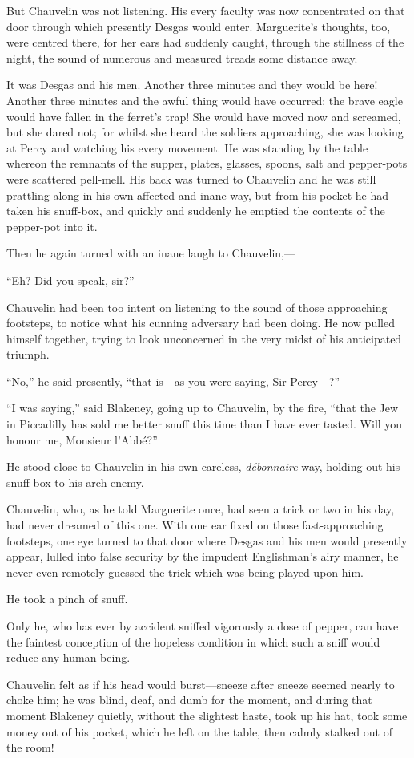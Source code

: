 But Chauvelin was not listening. His every faculty was now concentrated on that door through which presently Desgas would enter. Marguerite's thoughts, too, were centred there, for her ears had suddenly caught, through the stillness of the night, the sound of numerous and measured treads some distance away.

It was Desgas and his men. Another three minutes and they would be here! Another three minutes and the awful thing would have occurred: the brave eagle would have fallen in the ferret's trap! She would have moved now and screamed, but she dared not; for whilst she heard the soldiers approaching, she was looking at Percy and watching his every movement. He was standing by the table whereon the remnants of the supper, plates, glasses, spoons, salt and pepper-pots were scattered pell-mell. His back was turned to Chauvelin and he was still prattling along in his own affected and inane way, but from his pocket he had taken his snuff-box, and quickly and suddenly he emptied the contents of the pepper-pot into it.

Then he again turned with an inane laugh to Chauvelin,---

\enquote{Eh? Did you speak, sir?}

Chauvelin had been too intent on listening to the sound of those approaching footsteps, to notice what his cunning adversary had been doing. He now pulled himself together, trying to look unconcerned in the very midst of his anticipated triumph.

\enquote{No,} he said presently, \enquote{that is---as you were saying, Sir Percy---?}

\enquote{I was saying,} said Blakeney, going up to Chauvelin, by the fire, \enquote{that the Jew in Piccadilly has sold me better snuff this time than I have ever tasted. Will you honour me, Monsieur l'Abbé?}

He stood close to Chauvelin in his own careless, \textit{débonnaire} way, holding out his snuff-box to his arch-enemy.

Chauvelin, who, as he told Marguerite once, had seen a trick or two in his day, had never dreamed of this one. With one ear fixed on those fast-approaching footsteps, one eye turned to that door where Desgas and his men would presently appear, lulled into false security by the impudent Englishman's airy manner, he never even remotely guessed the trick which was being played upon him.

He took a pinch of snuff.

Only he, who has ever by accident sniffed vigorously a dose of pepper, can have the faintest conception of the hopeless condition in which such a sniff would reduce any human being.

Chauvelin felt as if his head would burst---sneeze after sneeze seemed nearly to choke him; he was blind, deaf, and dumb for the moment, and during that moment Blakeney quietly, without the slightest haste, took up his hat, took some money out of his pocket, which he left on the table, then calmly stalked out of the room!